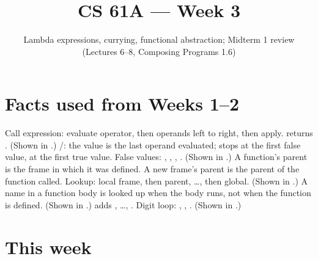 \documentclass[10pt]{scrartcl}
\title{CS 61A --- Week 3}
\subtitle{Lambda expressions, currying, functional abstraction; Midterm 1 review (Lectures 6--8, Composing Programs 1.6)}
\author{}\date{}\ihead{}
\begin{document}
\maketitle

\section{Facts used from Weeks 1--2}
\begin{enumerate}[label=(W\arabic*),leftmargin=2.8em,itemsep=4pt]
  \ii {}Call expression: evaluate operator, then operands left to right, then apply.  returns . (Shown in .)
  \ii {}/: the value is the last operand evaluated;  stops at the first false value,  at the first true value. False values: , , , . (Shown in .)
  \ii {}A function's parent is the frame in which it was defined. A new frame's parent is the parent of the function called. Lookup: local frame, then parent, \dots, then global. (Shown in .)
  \ii {}A name in a function body is looked up when the body runs, not when the function is defined. (Shown in .)
  \ii {} adds , \dots, . Digit loop: , , . (Shown in .)
\end{enumerate}

\section{This week}
\end{document}

